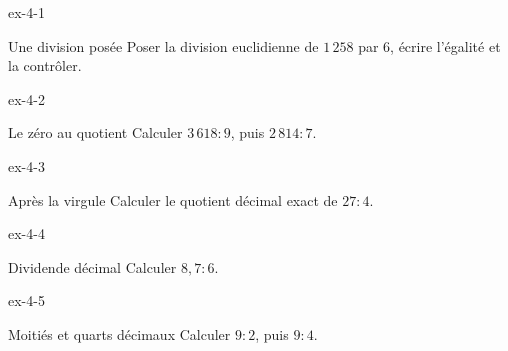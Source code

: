 \clearpage{}
\begin{blocLivre}{ex-4-1}\begin{exercice}[1]{Une division posée}
Poser la division euclidienne de $1\,258$ par 6, écrire l’égalité et la contrôler.
\end{exercice}\end{blocLivre}
\begin{blocLivre}{ex-4-2}\begin{exercice}[1]{Le zéro au quotient}
Calculer $3\,618:9$, puis $2\,814:7$.
\end{exercice}\end{blocLivre}
\begin{blocLivre}{ex-4-3}\begin{exercice}[1]{Après la virgule}
Calculer le quotient décimal exact de $27:4$.
\end{exercice}\end{blocLivre}
\begin{blocLivre}{ex-4-4}\begin{exercice}[1]{Dividende décimal}
Calculer $8{,}7:6$.
\end{exercice}\end{blocLivre}
\begin{blocLivre}{ex-4-5}\begin{exercice}[1]{Moitiés et quarts décimaux}
Calculer $9:2$, puis $9:4$.
\end{exercice}\end{blocLivre}

